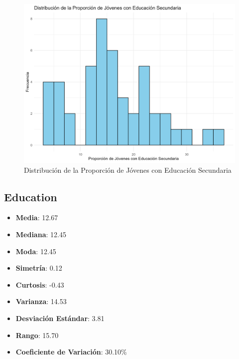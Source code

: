 \documentclass{article}
\begin{document}
\begin{figure}[h!]
\centering
\includegraphics[width=\textwidth]{Histogramas/histogram_examination.png}
\caption{Distribución de la Proporción de Jóvenes con Educación Secundaria}
\end{figure}

\subsection{Education}
\begin{itemize}
    \item \textbf{Media}: 12.67
    \item \textbf{Mediana}: 12.45
    \item \textbf{Moda}: 12.45
    \item \textbf{Simetría}: 0.12
    \item \textbf{Curtosis}: -0.43
    \item \textbf{Varianza}: 14.53
    \item \textbf{Desviación Estándar}: 3.81
    \item \textbf{Rango}: 15.70
    \item \textbf{Coeficiente de Variación}: 30.10\%
\end{itemize}
\end{document}
